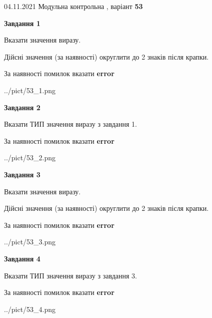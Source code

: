 \documentclass[11pt, ukrainian]{article}
\begin{document}
{04.11.2021 Модульна контрольна , варіант  \No \textbf { 53 }\par}
{
\begin {large}
{\begin {center}\textbf{Завдання 1}\end {center}}\par
Вказати значення виразу. \par
Дійсні значення (за наявності) округлити до 2 знаків після крапки. \par
За наявності помилок вказати \textbf{error}

\begin{center}
	{../pict/53_1.png}
\end{center}
\newpage

{\begin {center}\textbf{Завдання 2}\end {center}}\par
Вказати ТИП значення виразу з завдання 1. \par
За наявності помилок вказати \textbf{error}

\begin{center}
	{../pict/53_2.png}
\end{center}
\newpage

{\begin {center}\textbf{Завдання 3}\end {center}}\par
Вказати значення виразу. \par
Дійсні значення (за наявності) округлити до 2 знаків після крапки. \par
За наявності помилок вказати \textbf{error}

\begin{center}
	{../pict/53_3.png}
\end{center}
\newpage

{\begin {center}\textbf{Завдання 4}\end {center}}\par
Вказати ТИП значення виразу з завдання 3. \par
За наявності помилок вказати \textbf{error}

\begin{center}
	{../pict/53_4.png}
\end{center}
\newpage


\end{large}}
\end{document}
